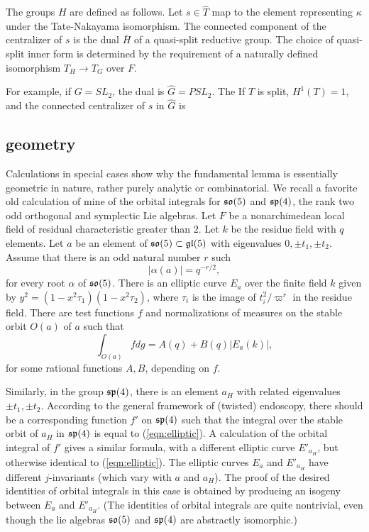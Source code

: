 \documentclass[brochure,english,12pt]{bourbaki}
\def\so{\frak{so}}
\def\sp{\frak{sp}}
\def\gl{\frak{gl}}
\begin{document}
The groups $H$ are defined as follows.  Let $s\in \hat T$ map
to the element representing $\kappa$ under the Tate-Nakayama isomorphism.
The connected component of the centralizer of $s$ is the dual $\bar H$
of a quasi-split reductive group.  The choice of
quasi-split inner form is determined by the requirement of a naturally
defined isomorphism $T_H\to T_G$ over $F$.

For example, if $G=SL_2$, the dual is $\hat G = PSL_2$.  The If $T$ is
split, $H^1(T)=1$, and the connected centralizer of $s$ in $\hat G$ is


\subsection{geometry}

Calculations in special cases show why the fundamental lemma is
essentially geometric in nature, rather purely analytic or
combinatorial. We recall a favorite old calculation of mine of the
orbital integrals for $\so(5)$ and $\sp(4)$, the rank two odd
orthogonal and symplectic Lie algebras.  Let $F$ be a nonarchimedean
local field of residual characteristic greater than $2$.  Let $k$ be
the residue field with $q$ elements.  Let $a$ be an element of
$\so(5)\subset \gl(5)$ with eigenvalues $0,\pm t_1,\pm t_2$.  Assume
that there is an odd natural number $r$ such
\[
|\alpha(a)| = q^{-r/2},
\]
for every root $\alpha$ of $\so(5)$. 
There is an elliptic curve $E_a$ over the finite field $k$ given by
$y^2 = (1-x^2\tau_1)(1-x^2\tau_2)$, where $\tau_i$ is the image
of $t_i^2/\varpi^r$ in the residue field.  There are test functions $f$ and normalizations of
measures on the stable orbit $O(a)$ of $a$ such that
\begin{equation}\label{eqn:elliptic}
\int_{O(a)} f dg = A(q) + B(q) | E_a(k)|,
\end{equation}
for some rational functions $A,B$, depending on $f$.

Similarly, in the group $\sp(4)$, there is an element ${a_H}$ with related eigenvalues $\pm
t_1,\pm t_2$.  According to the general framework of (twisted) endoscopy, there
should be a corresponding function $f'$ on $\sp(4)$ such that the
integral over the stable orbit of ${a_H}$ in $\sp(4)$ is equal to
(\ref{eqn:elliptic}).  A calculation of the orbital integral of $f'$ gives a similar formula, with
a different elliptic curve $E'_{a_H}$, but otherwise identical to (\ref{eqn:elliptic}).
The elliptic curves $E_a$ and $E'_{a_H}$
have different $j$-invariants (which vary with $a$ and ${a_H}$).  The
proof of the desired identities of orbital integrals in this case is
obtained by producing an isogeny between $E_a$ and $E'_{a_H}$.  (The identities of orbital integrals are quite
nontrivial, even though the lie algebras $\so(5)$ and $\sp(4)$ are abstractly isomorphic.)
\end{document}
